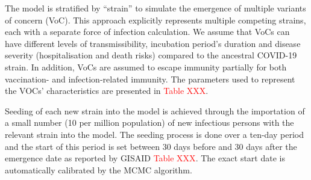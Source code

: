 
The model is stratified by ``strain'' to simulate the emergence of multiple variants of concern (VoC).
This approach explicitly represents multiple competing strains, each with a separate force of infection calculation.
We assume that VoCs can have different levels of transmissibility, incubation period's duration and disease severity 
(hospitalisation and death risks) compared to the ancestral COVID-19 strain. In addition, VoCs are assumed to escape 
immunity partially for both vaccination- and infection-related immunity. The parameters used to represent the VOCs'
characteristics are presented in \textcolor{red}{Table XXX}.

Seeding of each new strain into the model is achieved through the importation of a small number (10 per million population) of new infectious persons with the relevant strain into the model.
The seeding process is done over a ten-day period and the start of this period is set between 30 days before and 30 days after the emergence date
as reported by GISAID \textcolor{red}{Table XXX}. The exact start date is automatically calibrated by the MCMC algorithm.
